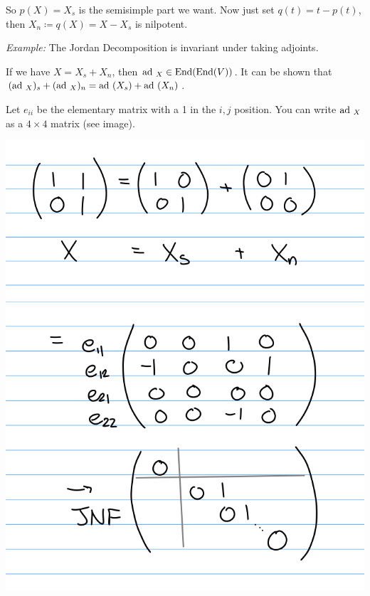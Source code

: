 So \(p(X) = X_s\) is the semisimple part we want. Now just set
\(q(t) = t - p(t)\), then \(X_n \coloneqq q(X) = X - X_s\) is nilpotent.

\emph{Example:} The Jordan Decomposition is invariant under taking
adjoints.

If we have \(X = X_s + X_n\), then
\(\mathrm{ad}~_X \in \mathrm{End}(\mathrm{End}(V))\). It can be shown that
\((\mathrm{ad}~_X)_s + (\mathrm{ad}~_X)_n = \mathrm{ad}~(X_s) + \mathrm{ad}~(X_n)\).

Let \(e_{ii}\) be the elementary matrix with a 1 in the \(i, j\)
position. You can write \(\mathrm{ad}~_X\) as a \(4\times 4\) matrix (see image).

\includegraphics{figures/2019-08-28-09:39.png}
\includegraphics{figures/2019-08-28-09:40.png}

